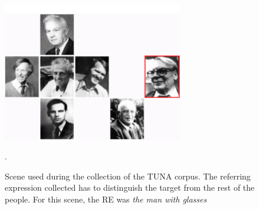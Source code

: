 \vspace*{-0.8cm}
\begin{figure}[ht]
\centering
\includegraphics[width=0.7\textwidth]{images/tuna-people.jpg}
\caption{Scene used during the collection of the TUNA corpus. The referring expression collected has to distinguish the target from the rest of the people. For this scene, the RE was \emph{the man with glasses}}. 
\label{Tuna-people-scene}
\centering

\end{figure} 



